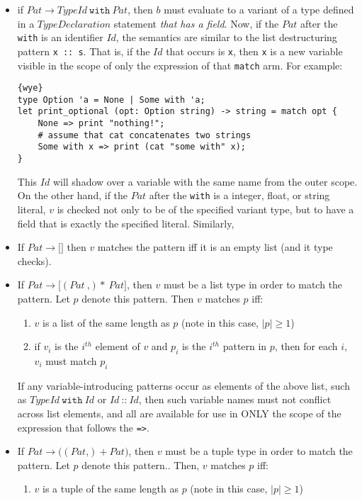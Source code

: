 \documentclass[a4paper, 12pt]{article}
\begin{document}
\begin{itemize}
\item if $Pat \to TypeId\:\texttt{with}\: Pat$, then $b$ must evaluate to a variant of a type defined in a $TypeDeclaration$ statement \textit{that has a field}. Now, if the $Pat$ after the \texttt{with} is an identifier $Id$, the semantics are similar to the list destructuring pattern \texttt{x :: s}. That is, if the $Id$ that occurs is \texttt{x}, then \texttt{x} is a new variable visible in the scope of only the expression of that \texttt{match} arm. For example:
\begin{lstlisting}{wye}
type Option 'a = None | Some with 'a;
let print_optional (opt: Option string) -> string = match opt {
	None => print "nothing!";
	# assume that cat concatenates two strings
	Some with x => print (cat "some with" x);
}
\end{lstlisting}
This $Id$ will shadow over a variable with the same name from the outer scope. On the other hand, if the $Pat$ after the \texttt{with} is a integer, float, or string literal, $v$ is checked not only to be of the specified variant type, but to have a field that is exactly the specified literal. Similarly, 
\item If $Pat \to \texttt{[}\texttt{]}$ then $v$ matches the pattern iff it is an empty list (and it type checks).
\item If $Pat \to \texttt{[}(Pat\: \texttt{,})*\: Pat\texttt{]}$, then $v$ must be a list type in order to match the pattern. Let $p$ denote this pattern. Then $v$ matches $p$ iff:
\begin{enumerate}
\item $v$ is a list of the same length as $p$ (note in this case, $|p| \geq 1$)
\item if $v_i$ is the $i^{th}$ element of $v$ and $p_i$ is the $i^{th}$ pattern in $p$, then for each $i$, $v_i$ must match $p_i$
\end{enumerate}
If any variable-introducing patterns occur as elements of the above list, such as $TypeId\:\texttt{with}\:Id$ or $Id\:\texttt{::}\:Id$, then such variable names must not conflict across list elements, and all are available for use in ONLY the scope of the expression that follows the \texttt{=>}.
\item If $Pat \to \texttt{(}(Pat\texttt{,})+ Pat\texttt{)}$, then $v$ must be a tuple type in order to match the pattern. Let $p$ denote this pattern.. Then, $v$ matches $p$ iff:
\begin{enumerate}
\item $v$ is a tuple of the same length as $p$ (note in this case, $|p| \geq 1$)

\end{enumerate}
\end{itemize}
\end{document}
